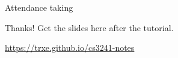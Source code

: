 \documentclass{beamer}
\begin{document}
\begin{frame}
    \AlegreyaExtraBold \LARGE
    Attendance taking
\end{frame}

\ThankYou
\begin{frame}
    Thanks! Get the slides here after the tutorial.\\
    \vspace{2em}
    \scalebox{3}{\faGithub}\par\bigskip
    \url{https://trxe.github.io/cs3241-notes}
\end{frame}
\end{document}
